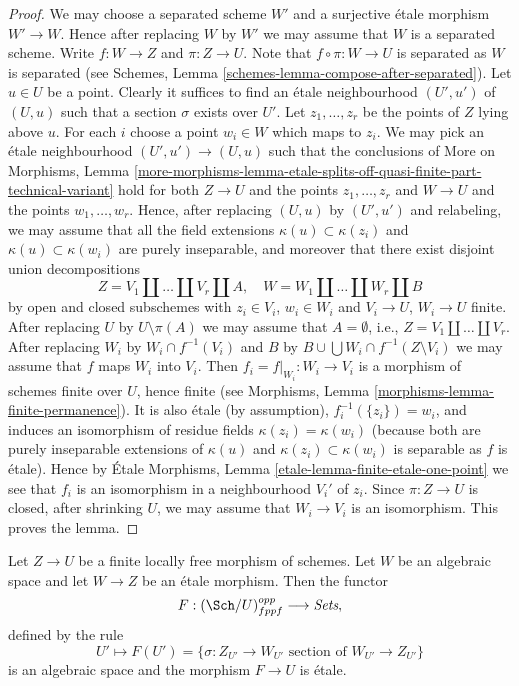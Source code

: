 \begin{proof}
We may choose a separated scheme $W'$ and a surjective \'etale morphism
$W' \to W$. Hence after replacing $W$ by $W'$ we may assume that $W$
is a separated scheme. Write $f : W \to Z$ and $\pi : Z \to U$.
Note that $f \circ \pi : W \to U$ is separated as
$W$ is separated (see
Schemes, Lemma \ref{schemes-lemma-compose-after-separated}).
Let $u \in U$ be a point. Clearly it suffices
to find an \'etale neighbourhood $(U', u')$ of $(U, u)$ such that
a section $\sigma$ exists over $U'$. Let $z_1, \ldots, z_r$
be the points of $Z$ lying above $u$. For each $i$ choose a point
$w_i \in W$ which maps to $z_i$. We may pick an \'etale neighbourhood
$(U', u') \to (U, u)$ such that the conclusions of
More on Morphisms, Lemma
\ref{more-morphisms-lemma-etale-splits-off-quasi-finite-part-technical-variant}
hold for both $Z \to U$ and the points $z_1, \ldots, z_r$
and $W \to U$ and the points $w_1, \ldots, w_r$. Hence, after
replacing $(U, u)$ by $(U', u')$ and relabeling, we may assume that
all the field extensions $\kappa(u) \subset \kappa(z_i)$ and
$\kappa(u) \subset \kappa(w_i)$ are purely inseparable, and moreover
that there exist disjoint union decompositions
$$
Z = V_1 \amalg \ldots \amalg V_r \amalg A, \quad
W = W_1 \amalg \ldots \amalg W_r \amalg B
$$
by open and closed subschemes
with $z_i \in V_i$, $w_i \in W_i$ and $V_i \to U$, $W_i \to U$ finite.
After replacing $U$ by $U \setminus \pi(A)$ we may assume that
$A = \emptyset$, i.e., $Z = V_1 \amalg \ldots \amalg V_r$.
After replacing $W_i$ by $W_i \cap f^{-1}(V_i)$ and
$B$ by $B \cup \bigcup W_i \cap f^{-1}(Z \setminus V_i)$
we may assume that $f$ maps $W_i$ into $V_i$.
Then $f_i = f|_{W_i} : W_i \to V_i$ is a morphism of schemes finite over $U$,
hence finite (see
Morphisms, Lemma \ref{morphisms-lemma-finite-permanence}).
It is also \'etale (by assumption),
$f_i^{-1}(\{z_i\}) = w_i$, and induces an isomorphism of residue
fields $\kappa(z_i) = \kappa(w_i)$ (because both are purely inseparable
extensions of $\kappa(u)$ and $\kappa(z_i) \subset \kappa(w_i)$
is separable as $f$ is \'etale). Hence by
\'Etale Morphisms, Lemma \ref{etale-lemma-finite-etale-one-point}
we see that $f_i$ is an isomorphism in a neighbourhood $V_i'$ of
$z_i$. Since $\pi : Z \to U$ is closed, after shrinking $U$, we may assume
that $W_i \to V_i$ is an isomorphism. This proves the lemma.
\end{proof}

\begin{lemma}
\label{lemma-space-of-sections}
Let $Z \to U$ be a finite locally free morphism of schemes.
Let $W$ be an algebraic space and let $W \to Z$ be an \'etale morphism.
Then the functor
$$
F : (\Sch/U)_{fppf}^{opp} \longrightarrow \textit{Sets},
$$
defined by the rule
$$
U' \longmapsto
F(U') =
\{\sigma : Z_{U'} \to W_{U'}\text{ section of }W_{U'} \to Z_{U'}\}
$$
is an algebraic space and the morphism $F \to U$ is \'etale.
\end{lemma}

